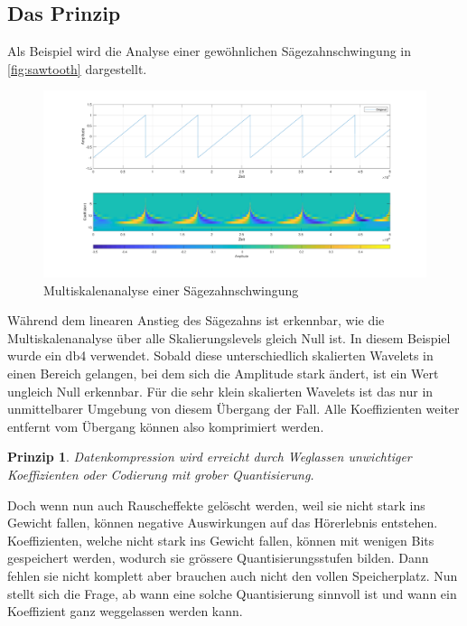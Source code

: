 \begin{refsection}
\subsection{Das Prinzip}
Als Beispiel wird die Analyse einer gewöhnlichen Sägezahnschwingung in \autoref{fig:sawtooth} dargestellt.
\begin{figure}
	\centering
	\includegraphics[width=\linewidth]{papers/compress/Bilder/sawtooth}
	\caption{Multiskalenanalyse einer Sägezahnschwingung}
	\label{fig:sawtooth}
\end{figure}
Während dem linearen Anstieg des Sägezahns ist erkennbar, wie die Multiskalenanalyse über alle Skalierungslevels gleich Null ist.
In diesem Beispiel wurde ein db4 verwendet.
Sobald diese unterschiedlich skalierten Wavelets in einen Bereich gelangen, bei dem sich die Amplitude stark ändert, ist ein Wert ungleich Null erkennbar.
Für die sehr klein skalierten Wavelets ist das nur in unmittelbarer Umgebung von diesem Übergang der Fall.
Alle Koeffizienten weiter entfernt vom Übergang können also komprimiert werden.

\newtheorem{Prinzip}{Prinzip}
\begin{Prinzip}
	Datenkompression wird erreicht durch Weglassen unwichtiger Koeffizienten oder Codierung mit grober Quantisierung.
\end{Prinzip}

Doch wenn nun auch Rauscheffekte gelöscht werden, weil sie nicht stark ins Gewicht fallen, können negative Auswirkungen auf das Hörerlebnis entstehen. 
Koeffizienten, welche nicht stark ins Gewicht fallen, können mit wenigen Bits gespeichert werden, wodurch sie grössere Quantisierungsstufen bilden. 
Dann fehlen sie nicht komplett aber brauchen auch nicht den vollen Speicherplatz.
Nun stellt sich die Frage, ab wann eine solche Quantisierung sinnvoll ist und wann ein Koeffizient ganz weggelassen werden kann. 


\end{refsection}
